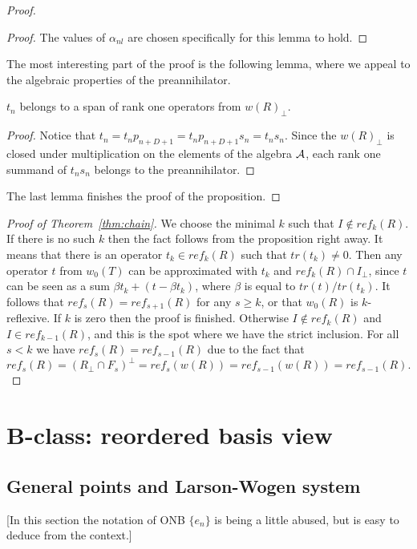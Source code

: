 \documentclass[12pt]{amsart}
\theoremstyle{case}
\begin{document}
\begin{proof}
    \begin{proof}
      The values of $\alpha_{nl}$ are chosen specifically for this lemma to hold.
    \end{proof}
    The most interesting part of the proof is the following lemma, where we appeal to the algebraic properties
      of the preannihilator.
    \begin{lemma}
     $t_n$ belongs to a span of rank one operators from $w(R)_\perp$.
    \end{lemma}
    \begin{proof}
      Notice that $t_n = t_n p_{n + D + 1} = t_n p_{n + D + 1} s_n = t_n s_n.$
      Since the $w(R)_\perp$ is closed under multiplication on the elements of the algebra $\cal{A}$,
        each rank one summand of $t_n s_n$ belongs to the preannihilator.
    \end{proof}
    The last lemma finishes the proof of the proposition.
  \end{proof}

  \begin{proof}[Proof of Theorem~\ref{thm:chain}]
    We choose the minimal $k$ such that $I \not\in ref_k(R)$.
    If there is no such $k$ then the fact follows from the proposition right away.
    It means that there is an operator $t_k \in ref_k(R)$ such that $tr(t_k) \neq 0$.
    Then any operator $t$ from $w_0(T)$ can be approximated with $t_k$ and $ref_k(R) \cap I_\perp$,
      since $t$ can be seen as a sum $\beta t_k + (t - \beta t_k)$, where $\beta$ is equal to $tr(t)/ tr(t_k)$.
    It follows that $ref_s(R) = ref_{s+1}(R)$ for any $s \geq k$, or that $w_0(R)$ is $k$-reflexive.
    If $k$ is zero then the proof is finished.
    Otherwise $I \not\in ref_k(R)$ and $I \in ref_{k - 1}(R)$, and this is the spot where we have
      the strict inclusion.
    For all $s < k$ we have $ref_s(R) = ref_{s-1}(R)$ due to the fact that
    \[
      ref_s(R) = (R_\perp \cap F_s)^\perp = ref_s(w(R)) = ref_{s - 1}(w(R)) = ref_{s-1}(R).
    \]
  \end{proof}

\section{B-class: reordered basis view}
  \subsection{General points and Larson-Wogen system}
    [In this section the notation of ONB $\{e_n\}$ is being a little abused, but is easy to deduce from the context.]
\end{document}
